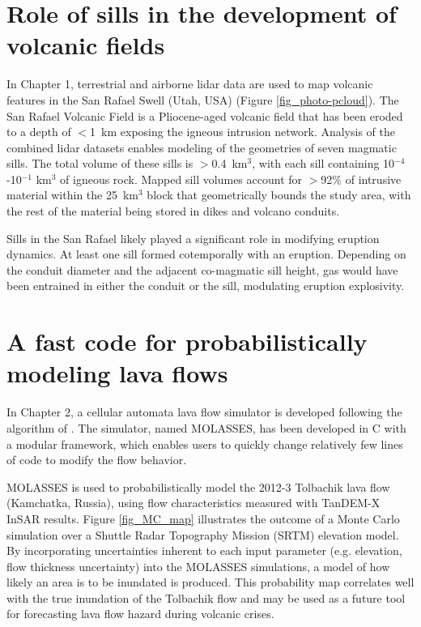 \section{Role of sills in the development of volcanic fields}

In Chapter 1, terrestrial and airborne lidar data are used to map volcanic features in the San Rafael Swell (Utah, USA) (Figure \ref{fig_photo-pcloud}). The San Rafael Volcanic Field is a Pliocene-aged volcanic field that has been eroded to a depth of $<$1~km exposing the igneous intrusion network. Analysis of the combined lidar datasets enables modeling of the geometries of seven magmatic sills. The total volume of these sills is $>$0.4~km$^3$, with each sill containing 10$^{-4}$-10$^{-1}$ km$^3$ of igneous rock. Mapped sill volumes account for $>$92\% of intrusive material within the 25~km$^3$ block that geometrically bounds the study area, with the rest of the material being stored in dikes and volcano conduits.

Sills in the San Rafael likely played a significant role in modifying eruption dynamics. At least one sill formed cotemporally with an eruption. Depending on the conduit diameter and the adjacent co-magmatic sill height, gas would have been entrained in either the conduit or the sill, modulating eruption explosivity.


\section{A fast code for probabilistically modeling lava flows}

In Chapter 2, a cellular auto\-mata \citep{wolfram1984cellular} lava flow simulator is developed following the algorithm of \citet{connor2012probabilistic}. The simulator, named MOLASSES, has been developed in C with a modular framework, which enables users to quickly change relatively few lines of code to modify the flow behavior.


MOLASSES is used to probabilistically model the 2012-3 Tolbachik lava flow (Kamchatka, Russia), using flow characteristics measured with TanDEM-X InSAR results. Figure \ref{fig_MC_map} illustrates the outcome of a Monte Carlo simulation over a Shuttle Radar Topography Mission (SRTM) elevation model. By incorporating uncertainties inherent to each input parameter (e.g. elevation, flow thickness uncertainty) into the MOLASSES simulations, a model of how likely an area is to be inundated is produced. This probability map correlates well with the true inundation of the Tolbachik flow and may be used as a future tool for forecasting lava flow hazard during volcanic crises.

